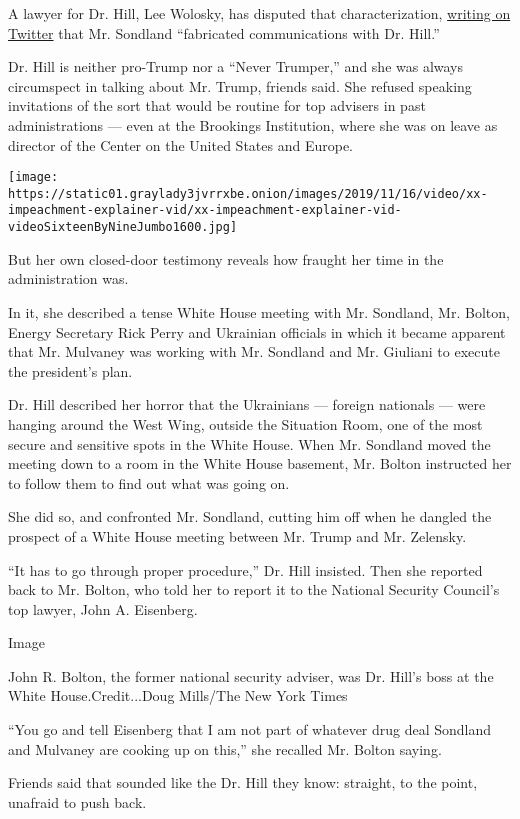 A lawyer for Dr. Hill, Lee Wolosky, has disputed that characterization,
\href{https://twitter.com/LeeWolosky/status/1192066926563999744}{writing
on Twitter} that Mr. Sondland ``fabricated communications with Dr.
Hill.''

Dr. Hill is neither pro-Trump nor a ``Never Trumper,'' and she was
always circumspect in talking about Mr. Trump, friends said. She refused
speaking invitations of the sort that would be routine for top advisers
in past administrations --- even at the Brookings Institution, where she
was on leave as director of the Center on the United States and Europe.

\texttt{[image: https://static01.graylady3jvrrxbe.onion/images/2019/11/16/video/xx-impeachment-explainer-vid/xx-impeachment-explainer-vid-videoSixteenByNineJumbo1600.jpg]}

But her own closed-door testimony reveals how fraught her time in the
administration was.

In it, she described a tense White House meeting with Mr. Sondland, Mr.
Bolton, Energy Secretary Rick Perry and Ukrainian officials in which it
became apparent that Mr. Mulvaney was working with Mr. Sondland and Mr.
Giuliani to execute the president's plan.

Dr. Hill described her horror that the Ukrainians --- foreign nationals
--- were hanging around the West Wing, outside the Situation Room, one
of the most secure and sensitive spots in the White House. When Mr.
Sondland moved the meeting down to a room in the White House basement,
Mr. Bolton instructed her to follow them to find out what was going on.

She did so, and confronted Mr. Sondland, cutting him off when he dangled
the prospect of a White House meeting between Mr. Trump and Mr.
Zelensky.

``It has to go through proper procedure,'' Dr. Hill insisted. Then she
reported back to Mr. Bolton, who told her to report it to the National
Security Council's top lawyer, John A. Eisenberg.

Image

John R. Bolton, the former national security adviser, was Dr. Hill's
boss at the White House.Credit...Doug Mills/The New York Times

``You go and tell Eisenberg that I am not part of whatever drug deal
Sondland and Mulvaney are cooking up on this,'' she recalled Mr. Bolton
saying.

Friends said that sounded like the Dr. Hill they know: straight, to the
point, unafraid to push back.

